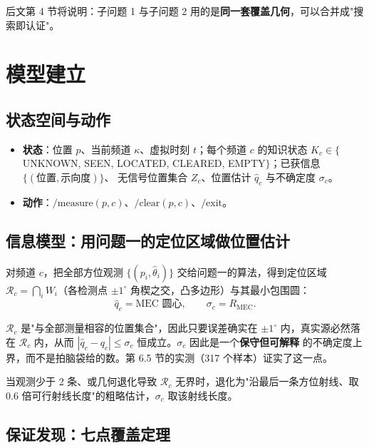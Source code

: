 后文第 4 节将说明：子问题 1 与子问题 2 用的是\textbf{同一套覆盖几何}，可以合并成"搜索即认证"。

\section{模型建立}

\subsection{状态空间与动作}

\begin{itemize}[leftmargin=1.8em]
  \item \textbf{状态}：位置 $p$、当前频道 $\kappa$、虚拟时刻 $t$；每个频道 $c$ 的知识状态
        $K_c\in\{$UNKNOWN, SEEN, LOCATED, CLEARED, EMPTY$\}$；已获信息 $\{(\text{位置},\text{示向度})\}$、
        无信号位置集合 $Z_c$、位置估计 $\hat q_c$ 与不确定度 $\sigma_c$。
  \item \textbf{动作}：$\text{/measure}(p,c)$、$\text{/clear}(p,c)$、$\text{/exit}$。
\end{itemize}

\subsection{信息模型：用问题一的定位区域做位置估计}

对频道 $c$，把全部方位观测 $\{(p_i,\hat\theta_i)\}$ 交给问题一的算法，得到定位区域
$\mathcal R_c=\bigcap_i W_i$（各检测点 $\pm1^{\circ}$ 角楔之交，凸多边形）与其最小包围圆：
\begin{equation}
\hat q_c=\text{MEC 圆心},\qquad \sigma_c=R_{\mathrm{MEC}} .
\end{equation}

\begin{keybox}[title=为什么这样定义不确定度]
$\mathcal R_c$ 是"与全部测量相容的位置集合"，因此只要误差确实在 $\pm1^{\circ}$ 内，真实源必然落在
$\mathcal R_c$ 内，从而 $|\hat q_c-q_c|\le\sigma_c$ 恒成立。$\sigma_c$ 因此是一个\textbf{保守但可解释}
的不确定度上界，而不是拍脑袋给的数。第 6.5 节的实测（317 个样本）证实了这一点。
\end{keybox}

当观测少于 2 条、或几何退化导致 $\mathcal R_c$ 无界时，退化为"沿最后一条方位射线、取
$0.6$ 倍可行射线长度"的粗略估计，$\sigma_c$ 取该射线长度。

\subsection{保证发现：七点覆盖定理}

